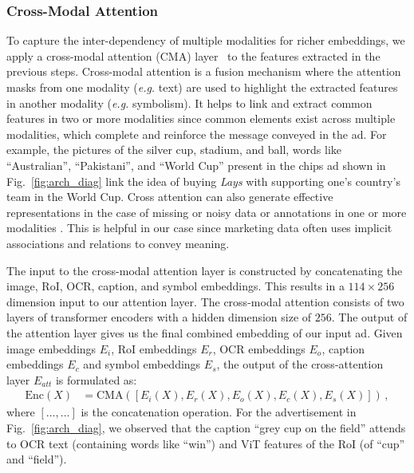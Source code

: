 \documentclass[hidelinks,11pt,a4paper]{report}
\renewcommand{\cite}[1]{\citep{#1}}
\begin{document}
\subsubsection{Cross-Modal Attention} 
To capture the inter-dependency of multiple modalities for richer embeddings, we apply a cross-modal attention (CMA) layer~\cite{frank2021vision} to the features extracted in the previous steps. Cross-modal attention is a fusion mechanism where the attention masks from one modality (\textit{e.g.} text) are used to highlight the extracted features in another modality (\textit{e.g.} symbolism). It helps to link and extract common features in two or more modalities since common elements exist across multiple modalities, which complete and reinforce the message conveyed in the ad. For example, the pictures of the silver cup, stadium, and ball, words like ``Australian'', ``Pakistani'', and ``World Cup'' present in the chips ad shown in Fig.~\ref{fig:arch_diag} link the idea of buying \textit{Lays} with supporting one's country's team in the World Cup. Cross attention can also generate effective representations in the case of missing or noisy data or annotations in one or more modalities \cite{frank2021vision}. This is helpful in our case since marketing data often uses implicit associations and relations to convey meaning. 

The input to the cross-modal attention layer is constructed by concatenating the image, RoI, OCR, caption, and symbol embeddings. This results in a $114 \times 256$ dimension input to our attention layer. The cross-modal attention consists of two layers of transformer encoders with a hidden dimension size of $256$. %
The output of the attention layer gives us the final combined embedding of our input ad. 
Given image embeddings $E_i$, RoI embeddings $E_r$, OCR embeddings $E_o$, caption embeddings $E_c$ and symbol embeddings $E_s$, the output of the cross-attention layer $E_{att}$ is formulated as:
\begin{align}
        \text{Enc}(X) &= \text{CMA}(\left[E_i(X),E_r(X), E_o(X),E_c(X),E_s(X)\right])\,, \nonumber
\end{align}
where $[\ldots,\ldots]$ is the concatenation operation. For the advertisement in Fig.~\ref{fig:arch_diag}, we observed that the caption ``grey cup on the field'' attends to OCR text (containing words like ``win'') and ViT features of the RoI (of ``cup'' and ``field'').
\end{document}
